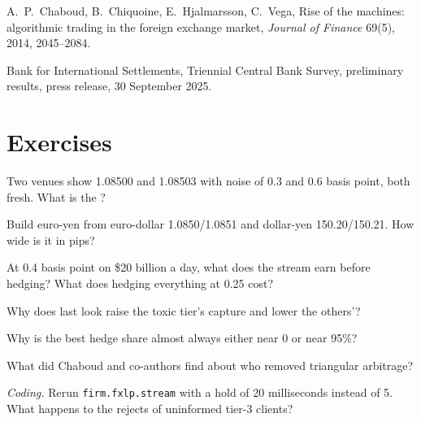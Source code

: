 \begin{omsources}
\item A.~P.~Chaboud, B.~Chiquoine, E.~Hjalmarsson, C.~Vega, Rise of the machines: algorithmic trading in the foreign exchange market, \emph{Journal
of Finance} 69(5), 2014, 2045--2084.
\item Bank for International Settlements, Triennial Central Bank Survey, preliminary results, press release, 30 September 2025.
\end{omsources}

\section{Exercises}

\begin{exercise}[$\star$]\label{exo:hf:fx-market-making:1}
Two venues show 1.08500 and 1.08503 with noise of 0.3 and 0.6 basis point, both fresh. What is the ?
\end{exercise}

\begin{exercise}[$\star$]\label{exo:hf:fx-market-making:2}
Build euro-yen from euro-dollar 1.0850/1.0851 and dollar-yen 150.20/150.21. How wide is it in pips?
\end{exercise}

\begin{exercise}[$\star$]\label{exo:hf:fx-market-making:3}
At 0.4 basis point on \$20 billion a day, what does the stream earn before hedging? What does hedging everything at 0.25 cost?
\end{exercise}

\begin{exercise}[$\star\star$]\label{exo:hf:fx-market-making:4}
Why does last look raise the toxic tier's capture and lower the others'?
\end{exercise}

\begin{exercise}[$\star\star$]\label{exo:hf:fx-market-making:5}
Why is the best hedge share almost always either near 0 or near 95\%?
\end{exercise}

\begin{exercise}[$\star\star$]\label{exo:hf:fx-market-making:6}
What did Chaboud and co-authors find about who removed triangular arbitrage?
\end{exercise}

\begin{exercise}[$\star\star\star$]\label{exo:hf:fx-market-making:7}
\emph{Coding.} Rerun \texttt{firm.fxlp.stream} with a hold of 20 milliseconds instead of 5. What happens to the rejects of uninformed tier-3 clients?
\end{exercise}

